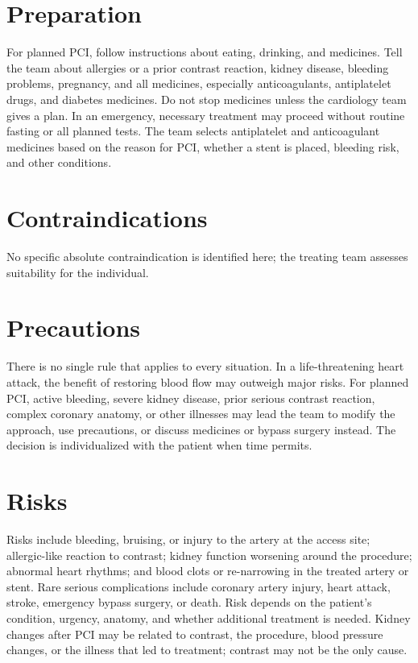 \section*{Preparation}
For planned PCI, follow instructions about eating, drinking, and medicines. Tell the team about allergies or a prior contrast reaction, kidney disease, bleeding problems, pregnancy, and all medicines, especially anticoagulants, antiplatelet drugs, and diabetes medicines. Do not stop medicines unless the cardiology team gives a plan. In an emergency, necessary treatment may proceed without routine fasting or all planned tests. The team selects antiplatelet and anticoagulant medicines based on the reason for PCI, whether a stent is placed, bleeding risk, and other conditions.

\section*{Contraindications}
No specific absolute contraindication is identified here; the treating team assesses suitability for the individual.

\section*{Precautions}
There is no single rule that applies to every situation. In a life-threatening heart attack, the benefit of restoring blood flow may outweigh major risks. For planned PCI, active bleeding, severe kidney disease, prior serious contrast reaction, complex coronary anatomy, or other illnesses may lead the team to modify the approach, use precautions, or discuss medicines or bypass surgery instead. The decision is individualized with the patient when time permits.

\section*{Risks}
Risks include bleeding, bruising, or injury to the artery at the access site; allergic-like reaction to contrast; kidney function worsening around the procedure; abnormal heart rhythms; and blood clots or re-narrowing in the treated artery or stent. Rare serious complications include coronary artery injury, heart attack, stroke, emergency bypass surgery, or death. Risk depends on the patient's condition, urgency, anatomy, and whether additional treatment is needed. Kidney changes after PCI may be related to contrast, the procedure, blood pressure changes, or the illness that led to treatment; contrast may not be the only cause.

